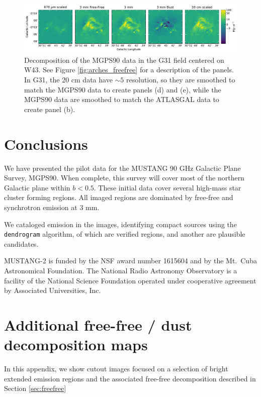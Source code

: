 \documentclass[twocolumn]{aastex62}
\newcommand{\MUSTANG}{MUSTANG-2\xspace}
\begin{document}
\begin{figure}[htp]
    \includegraphics[width=17cm]{figures/G31_w43_5panel.pdf}
    \caption{Decomposition of the MGPS90 data in the G31 field centered on W43.
    See Figure \ref{fig:arches_freefree} for a description of the panels.
    In G31, the 20 cm data have $\sim5$ \arcsec resolution, so they are
    smoothed to match the MGPS90 data to create panels (d) and (e), while the
    MGPS90 data are smoothed to match the ATLASGAL data to create panel (b).
}
\label{fig:w43freefree}
\end{figure}





\section{Conclusions}
We have presented the pilot data for the MUSTANG 90 GHz Galactic Plane
Survey, MGPS90.  When complete, this survey
will cover most of the northern Galactic plane within $b<0.5$.
These initial data cover several high-mass star cluster
forming regions.  All imaged regions are dominated by free-free and synchrotron
emission at 3 mm.  

We cataloged emission in the images, identifying \nsources compact sources using the
\texttt{dendrogram} algorithm, of which \ncompacthiicand are verified \hchii
regions, and another \mmdetectionscmnondetectionscompact are plausible
candidates.  

\acknowledgements
\MUSTANG is funded by the NSF award number 1615604 and by the Mt.\ Cuba
Astronomical Foundation. The National Radio Astronomy Observatory is a facility
of the National Science Foundation operated under cooperative agreement by
Associated Universities, Inc.



\appendix

\section{Additional free-free / dust decomposition maps}
In this appendix, we show cutout images focused on a selection of bright extended emission regions
and the associated free-free decomposition described in Section \ref{sec:freefree}
\end{document}
